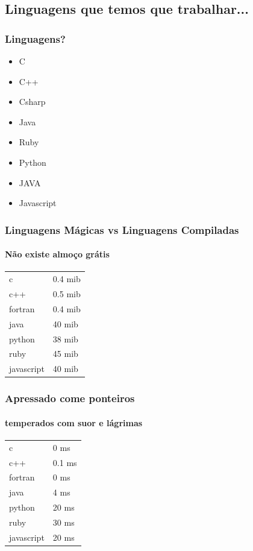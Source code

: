 \documentclass{beamer}
\begin{document}
\subsection{Linguagens que temos que trabalhar...}

\begin{frame} \frametitle{Linguagens?}
 \begin{itemize}
  \item C
  \item C++
  \item Csharp
  \item Java
  \item Ruby
  \item Python
  \item JAVA
  \item Javascript
 \end{itemize}
\end{frame}

\begin{frame} \frametitle{ Linguagens Mágicas vs Linguagens Compiladas }
    \framesubtitle { Não existe almoço grátis }
 \begin{center}
\begin{tabular}{ll}
    c & 0.4 mib\\
    c++ & 0.5 mib\\
    fortran & 0.4 mib \\
    java & 40 mib \\
    python & 38 mib \\
    ruby & 45 mib \\
    javascript & 40 mib
 \end{tabular}
 \end{center}
\end{frame}

\begin{frame} \frametitle{ Apressado come ponteiros }
    \framesubtitle { temperados com suor e lágrimas }
 \begin{center}
\begin{tabular}{ll}
    c & 0 ms\\
    c++ & 0.1 ms\\
    fortran & 0 ms \\
    java & 4 ms \\
    python & 20 ms \\
    ruby & 30 ms \\
    javascript & 20 ms
 \end{tabular}
 \end{center}
\end{frame}
\end{document}
